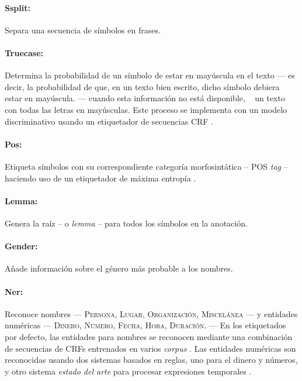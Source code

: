 \paragraph{Ssplit:} Separa una secuencia de símbolos en frases.

\paragraph{Truecase:} Determina la probabilidad de un símbolo de estar en
mayúscula en el texto --- es decir, la probabilidad de que, en un texto bien
escrito, dicho símbolo debiera estar en mayúscula. --- cuando esta información
no está disponible, \eg~ un texto con todas las letras en mayúsculas. Este
proceso se implementa con un modelo discriminativo usando un etiquetador de
secuencias \ac{CRF} \cite{Finkel2005}.

\paragraph{Pos:} Etiqueta símbolos con su correspondiente categoría
morfosintática -- \ac{POS} \emph{tag} -- haciendo uso de un etiquetador de
máxima entropía \cite{Toutanova2003}.

\paragraph{Lemma:} Genera la raíz -- o \emph{lemma} -- para todos los símbolos
en la anotación.

\paragraph{Gender:} Añade información sobre el género más probable a los
nombres.

\paragraph{Ner:} Reconoce nombres --- \textsc{Persona, Lugar, Organización,
  Miscelánea} --- y entidades numéricas --- \textsc{Dinero, Número, Fecha, Hora,
  Duración}. --- En los etiquetados por defecto, las entidades para nombres se
reconocen mediante una combinación de secuencias de \acp{CRF} entrenados en
varios \emph{corpus} \cite{Finkel2005}. Las entidades numéricas son reconocidas
usando dos sistemas basados en reglas, uno para el dinero y números, y otro
sistema \emph{estado del arte} para procesar expresiones temporales
\cite{Chang2012}.

